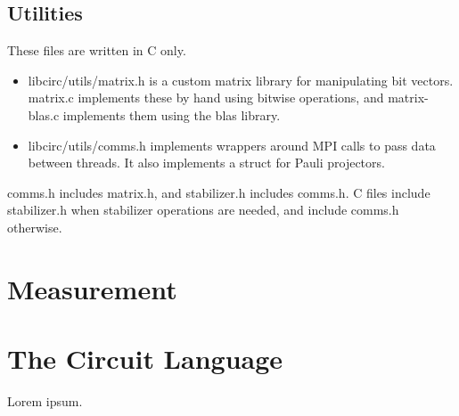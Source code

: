 \documentclass[11pt]{article}
\begin{document}
\subsection{Utilities}

These files are written in C only. 
\begin{itemize}
    \item libcirc/utils/matrix.h is a custom matrix library for manipulating bit vectors. \mbox{matrix.c} implements these by hand using bitwise operations, and \mbox{matrix-blas.c} implements them using the blas library.
    \item libcirc/utils/comms.h implements wrappers around MPI calls to pass data between threads. It also implements a struct for Pauli projectors.
\end{itemize}

comms.h includes matrix.h, and stabilizer.h includes comms.h. C files include \mbox{stabilizer.h} when stabilizer operations are needed, and include comms.h otherwise.


\section{Measurement}

\section{The Circuit Language} \label{sec:lang}
Lorem ipsum.
\end{document}
